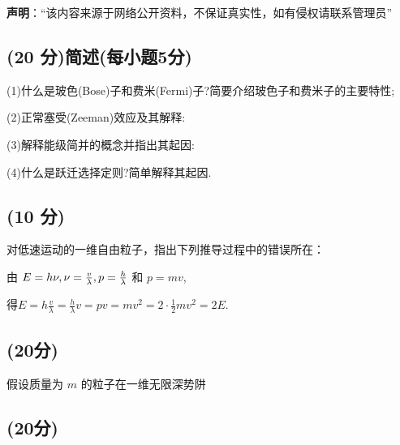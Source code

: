 
\textbf{声明}：“该内容来源于网络公开资料，不保证真实性，如有侵权请联系管理员”

\subsection{(20 分)简述(每小题5分)}
(1)什么是玻色(Bose)子和费米(Fermi)子?简要介绍玻色子和费米子的主要特性;

(2)正常塞受(Zeeman)效应及其解释:

(3)解释能级简并的概念并指出其起因:

(4)什么是跃迁选择定则?简单解释其起因.
\subsection{(10 分)}
对低速运动的一维自由粒子，指出下列推导过程中的错误所在：

由 $E = h \nu, \\ \nu = \frac{v}{\lambda}, \\ p = \frac{h}{\lambda}$ 和 $ p = mv$,

得$E = h \frac{v}{\lambda} = \frac{h}{\lambda} v = p v = mv^2 = 2 \cdot \frac{1}{2} mv^2 = 2E$.
\subsection{(20分)}
假设质量为 $m$ 的粒子在一维无限深势阱

\subsection{(20分)}